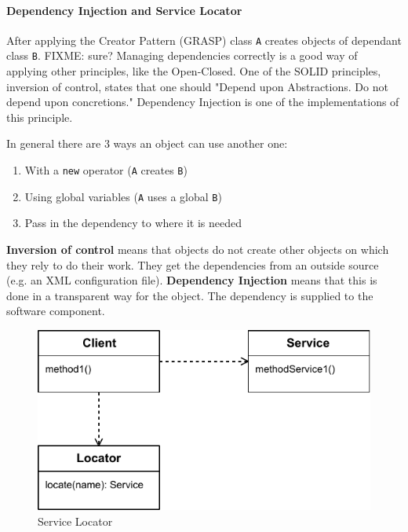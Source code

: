 \paragraph{Dependency Injection and Service Locator} 
After applying the Creator Pattern (\ac{GRASP}) class \texttt{A} creates objects of dependant class \texttt{B}.
FIXME: sure? Managing dependencies correctly is a good way of applying other principles, like the Open-Closed.
One of the \ac{SOLID} principles, inversion of control, states that one should "Depend upon Abstractions. Do not depend upon concretions."
Dependency Injection is one of the implementations of this principle.

\cite{Fowler}

In general there are 3 ways an object can use another one:
\begin{enumerate}
	\item With a \texttt{new} operator (\texttt{A} creates \texttt{B})
	\item Using global variables (\texttt{A} uses a global \texttt{B})
	\item Pass in the dependency to where it is needed
\end{enumerate}

\textbf{Inversion of control} means that objects do not create other objects on which they rely to do their work.
They get the dependencies from an outside source (e.g. an \ac{XML} configuration file).
\textbf{Dependency Injection} means that this is done in a transparent way for the object.
The dependency is supplied to the software component.

\begin{figure}[htb]
    \centering
    \includegraphics{figures/design-patterns-servicelocator.pdf}
    \caption{Service Locator}
    \label{fig:design-service-locator}
\end{figure}

